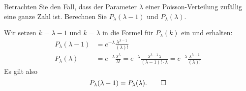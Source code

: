 Betrachten Sie den Fall, dass der Parameter $\lambda$ einer Poisson-Verteilung
zufällig eine ganze Zahl ist.
Berechnen Sie $P_\lambda(\lambda-1)$ und $P_\lambda(\lambda)$.

\begin{loesung}
Wir setzen $k=\lambda-1$ und $k=\lambda$ in die Formel für $P_\lambda(k)$ ein
und erhalten:
\begin{align*}
P_\lambda(\lambda-1)
&=
e^{-\lambda}\frac{\lambda^{\lambda -1 }}{(\lambda)!}
\\
P_\lambda(\lambda)
&=
e^{-\lambda}\frac{\lambda^{\lambda}}{\lambda!}
=
e^{-\lambda}\frac{\lambda^{\lambda-1}\lambda}{(\lambda-1)!\cdot\lambda}
=
e^{-\lambda}\frac{\lambda^{\lambda -1 }}{(\lambda)!}
\end{align*}
Es gilt also
\[
P_\lambda(\lambda -1)=P_\lambda(\lambda).
\qedhere
\]
\end{loesung}

